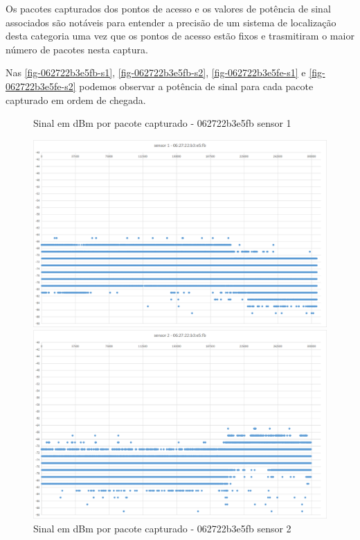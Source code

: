 Os pacotes capturados dos pontos de acesso e os valores de potência de sinal
associados são notáveis para entender a precisão de um sistema de localização
desta categoria uma vez que os pontos de acesso estão fixos e trasmitiram o
maior número de pacotes nesta captura.

Nas \autoref{fig-062722b3e5fb-s1}, \autoref{fig-062722b3e5fb-s2},
\autoref{fig-062722b3e5fe-s1} e \autoref{fig-062722b3e5fe-s2} podemos observar
a potência de sinal para cada pacote capturado em ordem de chegada.

\begin{figure}[htb]
	\begin{minipage}{0.49\textwidth}
	\centering
		\caption{\label{fig-062722b3e5fb-s1}Sinal em dBm por pacote capturado - 062722b3e5fb sensor 1}
		\includegraphics[width=1\textwidth]{060-testes/data-analisis/night-run/062722b3e5fb-sensor-01.png}
	\end{minipage}
\hfill
	\begin{minipage}{0.49\textwidth}
	\centering
		\caption{\label{fig-062722b3e5fb-s2}Sinal em dBm por pacote capturado - 062722b3e5fb sensor 2}
		\includegraphics[width=1\textwidth]{060-testes/data-analisis/night-run/062722b3e5fb-sensor-02.png}

\end{minipage}
\end{figure}
